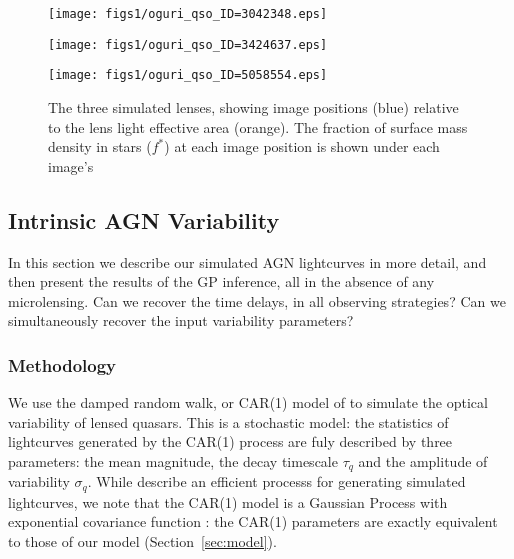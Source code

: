 \documentclass[useAMS,usenatbib, a4paper]{mn2e} \usepackage{natbib}
\begin{document}
\begin{figure*}
\begin{minipage}{0.32\linewidth}
\centering\texttt{[image: figs1/oguri\_qso\_ID=3042348.eps]}
\end{minipage}
\begin{minipage}{0.32\linewidth}
\centering\texttt{[image: figs1/oguri\_qso\_ID=3424637.eps]}
\end{minipage}
\begin{minipage}{0.32\linewidth}
\centering\texttt{[image: figs1/oguri\_qso\_ID=5058554.eps]}
\end{minipage}\hfill
\caption{The three simulated lenses, showing image positions (blue) relative
to the lens light effective area (orange). The fraction of surface mass
density in stars ($f^{*}$) at each image position is shown under each image's\label{lenslayouts}}
\end{figure*}



\subsection{Intrinsic AGN Variability}

In this section we describe our simulated AGN lightcurves in more detail, and
then present the results of the GP inference, all in the absence of any
microlensing. Can we recover the time delays, in all observing strategies? Can
we simultaneously recover the input variability parameters?

\subsubsection{Methodology}

We use the damped random walk, or CAR(1) model of \citet{Kel++09} to simulate
the optical variability of lensed quasars. This is a stochastic model: the
statistics of lightcurves generated by the CAR(1) process are fuly described
by three parameters: the mean magnitude, the decay timescale $\tau_q$ and the
amplitude of  variability $\sigma_q$. While \citeauthor{Kel++09} describe an
efficient processs for generating simulated lightcurves,  we note that the
CAR(1) model is a Gaussian Process with exponential covariance function
\citep{Zu++10}: the CAR(1) parameters are exactly equivalent to those of our
model (Section~\ref{sec:model}). 
\end{document}
